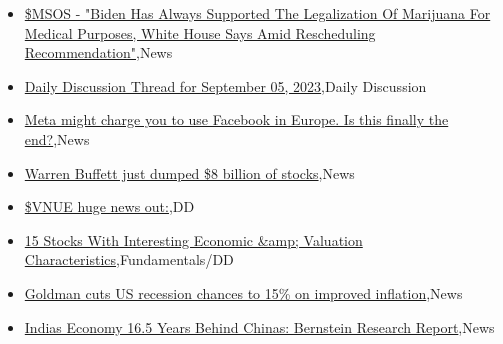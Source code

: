 \documentclass{article}%
\begin{document}
%
\begin{itemize}%
\item%
\href{https://reddit.com/r/wallstreetbets/comments/16aly5w/msos\_biden\_has\_always\_supported\_the\_legalization/}{\$MSOS - "Biden Has Always Supported The Legalization Of Marijuana For Medical Purposes, White House Says Amid Rescheduling Recommendation"},News%
\item%
\href{https://reddit.com/r/wallstreetbets/comments/16ak0ol/daily\_discussion\_thread\_for\_september\_05\_2023/}{Daily Discussion Thread for September 05, 2023},Daily Discussion%
\item%
\href{https://reddit.com/r/wallstreetbets/comments/16ad2k7/meta\_might\_charge\_you\_to\_use\_facebook\_in\_europe/}{Meta might charge you to use Facebook in Europe. Is this finally the end?},News%
\item%
\href{https://reddit.com/r/wallstreetbets/comments/16ach1o/warren\_buffett\_just\_dumped\_8\_billion\_of\_stocks/}{Warren Buffett just dumped \$8 billion of stocks},News%
\item%
\href{https://reddit.com/r/Baystreetbets/comments/16an2ex/vnue\_huge\_news\_out/}{\$VNUE huge news out:},DD%
\item%
\href{https://reddit.com/r/StockMarket/comments/16a2ihk/15\_stocks\_with\_interesting\_economic\_valuation/}{15 Stocks With Interesting Economic \&amp; Valuation Characteristics},Fundamentals/DD%
\item%
\href{https://reddit.com/r/Economics/comments/16akps3/goldman\_cuts\_us\_recession\_chances\_to\_15\_on/}{Goldman cuts US recession chances to 15\% on improved inflation},News%
\item%
\href{https://reddit.com/r/Economics/comments/16agend/indias\_economy\_165\_years\_behind\_chinas\_bernstein/}{Indias Economy 16.5 Years Behind Chinas: Bernstein Research Report},News%
\end{itemize}%
\end{document}
